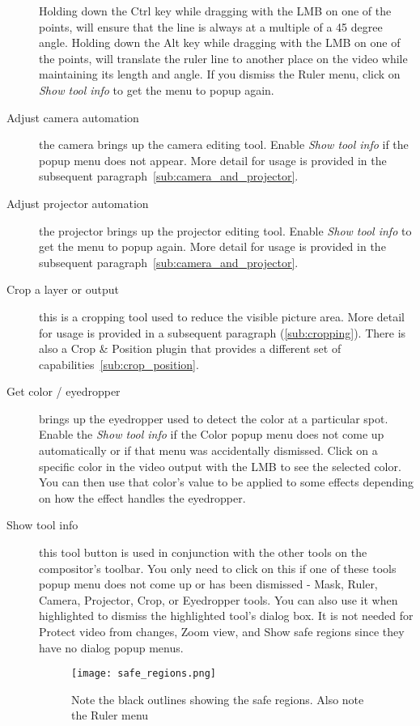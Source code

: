 \begin{description}
Holding down the Ctrl key while dragging with the LMB on one of the points, will
ensure that the line is always at a multiple of a 45 degree angle.  Holding down the Alt key while
dragging with the LMB on one of the points, will translate the ruler line to another place on 
the video while maintaining its length and angle. If you dismiss the Ruler menu, click on
\textit{Show tool info} to get the menu to popup again.  
    \item[Adjust camera automation]  the camera brings up the camera editing tool. Enable \textit{Show tool info} if the popup menu does not appear. More detail for usage is provided in the subsequent
paragraph~\ref{sub:camera_and_projector}.
    \item[Adjust projector automation]  the projector brings up the projector editing tool. Enable \textit{Show tool info} to get the menu to popup again. More detail for usage is provided in the
subsequent paragraph~\ref{sub:camera_and_projector}.
    \item[Crop a layer or output]  this is a cropping tool used to reduce the visible picture area.
More detail for usage is provided in a 
subsequent paragraph (\ref{sub:cropping}).  There is also a Crop \& Position plugin that provides
a different set of capabilities~\ref{sub:crop_position}.
    \item[Get color / eyedropper]  brings up the eyedropper used to detect the color at a
particular spot.  Enable the \textit{Show tool info} if the Color popup menu does not come up 
automatically or if that menu was accidentally dismissed.  Click on a specific color in the video
output with the LMB to see the selected color. You can then use that color's 
value to be applied to some effects depending on how the effect handles the eyedropper.
    \item[Show tool info]  this tool button is used in conjunction with the other tools on the
compositor's toolbar. You only need to click on this if one of these tools popup menu does not
come up or has been dismissed - Mask, Ruler, Camera, Projector, Crop, or Eyedropper tools.
You can also use it when highlighted to dismiss the highlighted tool's dialog box.
It is not needed for Protect video from changes, Zoom view, and Show safe regions since they have
no dialog popup menus.

\begin{figure}[htpb]
    \centering
    \texttt{[image: safe\_regions.png]}
    \caption{Note the black outlines showing the safe regions. Also note the Ruler menu}
    \label{fig:safe_regions}
\end{figure}


\end{description}
